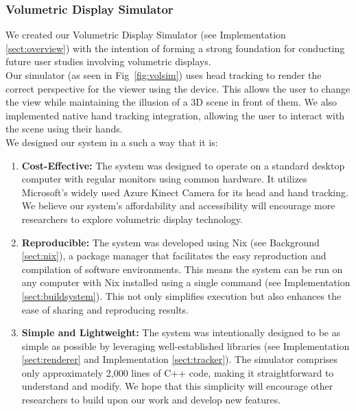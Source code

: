 \subsubsection{Volumetric Display Simulator}
We created our Volumetric Display Simulator (see Implementation \ref{sect:overview}) with the intention of forming a strong foundation for conducting future user studies involving volumetric displays. \\

Our simulator (as seen in Fig~\ref{fig:volsim}) uses head tracking to render the correct perspective for the viewer using the device. This allows the user to change the view while maintaining the illusion of a 3D scene in front of them. We also implemented native hand tracking integration, allowing the user to interact with the scene using their hands. \\

We designed our system in a such a way that it is: 

\begin{enumerate}
    \item \textbf{Cost-Effective:} The system was designed to operate on a standard desktop computer with regular monitors using common hardware. It utilizes Microsoft's widely used Azure Kinect Camera for its head and hand tracking. We believe our system's affordability and accessibility will encourage more researchers to explore volumetric display technology.

    \item \textbf{Reproducible:} The system was developed using Nix (see Background \ref{sect:nix}), a package manager that facilitates the easy reproduction and compilation of software environments. This means the system can be run on any computer with Nix installed using a single command (see Implementation \ref{sect:buildsystem}). This not only simplifies execution but also enhances the ease of sharing and reproducing results.

    \item \textbf{Simple and Lightweight:} The system was intentionally designed to be as simple as possible by leveraging well-established libraries (see Implementation \ref{sect:renderer} and Implementation \ref{sect:tracker}). The simulator comprises only approximately 2,000 lines of C++ code, making it straightforward to understand and modify. We hope that this simplicity will encourage other researchers to build upon our work and develop new features.
\end{enumerate}

